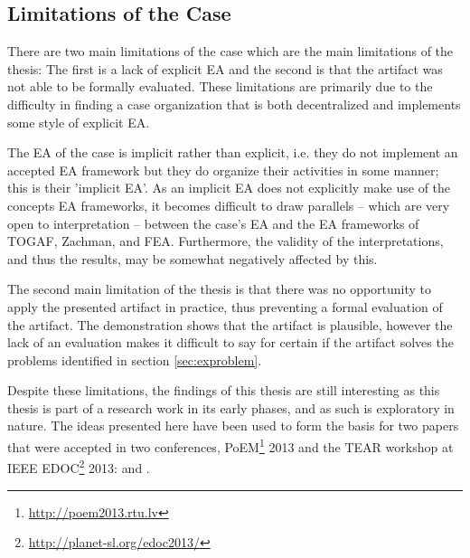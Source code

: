 \subsection{Limitations of the Case}

There are two main limitations of the case which are the main limitations of the thesis: The first is a lack of explicit EA and the second is that the artifact was not able to be formally evaluated. These limitations are primarily due to the difficulty in finding a case organization that is both decentralized and implements some style of explicit EA. 

The EA of the case is implicit rather than explicit, i.e. they do not implement an accepted EA framework but they do organize their activities in some manner; this is their 'implicit EA'. As an implicit EA does not explicitly make use of the concepts EA frameworks, it becomes difficult to draw parallels -- which are very open to interpretation -- between the case's EA and the EA frameworks of TOGAF, Zachman, and FEA. Furthermore, the validity of the interpretations, and thus the results, may be somewhat negatively affected by this. 

The second main limitation of the thesis is that there was no opportunity to apply the presented artifact in practice, thus preventing a formal evaluation of the artifact. The demonstration shows that the artifact is plausible, however the lack of an evaluation makes it difficult to say for certain if the artifact solves the problems identified in section \ref{sec:exproblem}.

Despite these limitations, the findings of this thesis are still interesting as this thesis is part of a research work in its early phases, and as such is exploratory in nature. The ideas presented here have been used to form the basis for two papers that were accepted in two conferences, PoEM\footnote{\url{http://poem2013.rtu.lv}} 2013 and the TEAR workshop at IEEE EDOC\footnote{\url{http://planet-sl.org/edoc2013/}} 2013: \cite{speckert2013} and \cite{rychkova2013}.

  